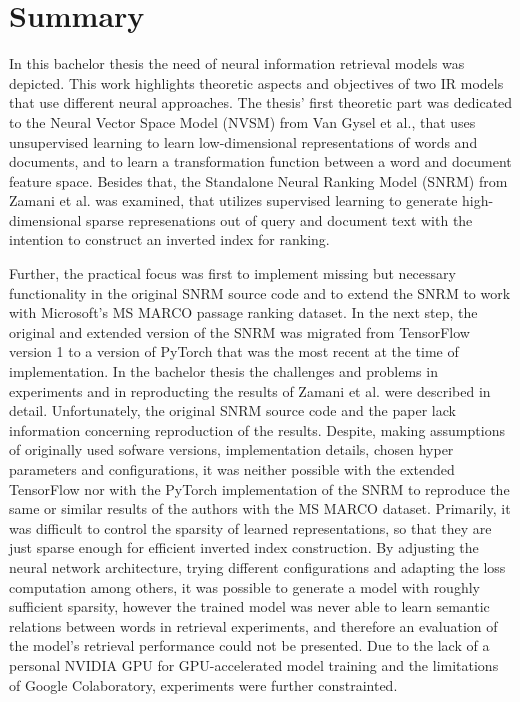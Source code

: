 \chapter{Summary}

In this bachelor thesis the need of neural information retrieval models was 
    depicted.
This work highlights theoretic aspects and objectives of
    two IR models that use different neural approaches.
The thesis' first theoretic part was dedicated to 
    the Neural Vector Space Model (NVSM) from Van Gysel et al.,
    that uses unsupervised learning to learn low-dimensional representations 
    of words and documents, and to learn a transformation function between
    a word and document feature space.
Besides that, the Standalone Neural Ranking Model (SNRM) from Zamani et al.
    was examined,
    that utilizes supervised learning to generate high-dimensional sparse
    represenations out of query and document text with the intention 
    to construct an inverted index for ranking.

Further, the practical focus was first to implement missing but necessary
    functionality in the original SNRM source code and to  
    extend the SNRM to work with
    Microsoft's MS MARCO passage ranking dataset.
In the next step, the original and extended version of the SNRM was
    migrated from TensorFlow version 1 to a
    version of PyTorch that was the most recent at the time of 
    implementation.
In the bachelor thesis the challenges and problems in experiments and 
    in reproducting the results of Zamani et al. were described in detail.
Unfortunately, the original SNRM source code and the paper lack 
    information concerning reproduction of the results.
Despite, making assumptions of originally used sofware versions,
    implementation details,
    chosen hyper parameters and configurations, it was neither possible
    with the extended TensorFlow nor with the PyTorch implementation of the SNRM 
    to reproduce the same or similar results of the authors 
    with the MS MARCO dataset.
Primarily, it was difficult to control the sparsity of
    learned representations, so that they are just sparse enough for
    efficient inverted index construction.
By adjusting the neural network architecture, 
    trying different configurations and adapting the loss computation
    among others,
    it was possible to generate a model with roughly sufficient sparsity,
    however the trained model was never able to learn semantic relations 
    between words in retrieval experiments, 
    and therefore an evaluation of the model's retrieval performance could not 
    be presented.
Due to the lack of a personal NVIDIA GPU for GPU-accelerated model training 
    and the limitations of Google Colaboratory, experiments were further 
    constrainted.

